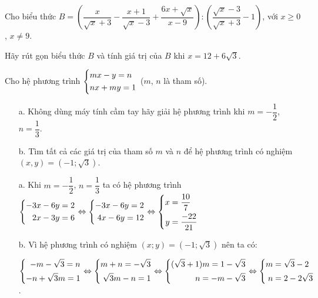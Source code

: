 \begin{ex}%
  Cho biểu thức $B=\left(\dfrac{x}{\sqrt{x}+3}-\dfrac{x+1}{\sqrt{x}-3}+\dfrac{6x+\sqrt{x}}{x-9}\right):\left(\dfrac{\sqrt{x}-3}{\sqrt{x}+3}-1\right)$, với $x\geq 0$, $x\neq 9$.
  
  Hãy rút gọn biểu thức $B$ và tính giá trị của $B$ khi $x=12+6\sqrt{3}$.
\end{ex}
\begin{ex}%
    Cho hệ phương trình $\left\{\begin{aligned}& mx-y=n\\&nx+my=1\end{aligned}\right.$ ($m$, $n$ là tham số).
    \begin{enumerate}
        \item[a.] Không dùng máy tính cầm tay hãy giải hệ phương trình khi $m=-\dfrac{1}{2}$, $n=\dfrac{1}{3}$.
        \item[b.] Tìm tất cả các giá trị của tham số $m$ và $n$ để hệ phương trình có nghiệm $(x,y)=(-1;\sqrt{3})$.
    \end{enumerate}
\loigiai
    {
   \begin{enumerate}
   	\item[a.] Khi $m=-\dfrac{1}{2}$, $n=\dfrac{1}{3}$ ta có hệ phương trình $\left\{\begin{aligned}-3x-6y=2\\2x-3y=6\end{aligned}\right.\Leftrightarrow\left\{\begin{aligned}-3x-6y=2\\4x-6y=12\end{aligned}\right.\Leftrightarrow\left\{\begin{aligned}x&=\dfrac{10}{7}\\y&=\dfrac{-22}{21}\end{aligned}\right.$
   	\item[b.] Vì hệ phương trình có nghiệm $(x;y)=(-1;\sqrt{3})$ nên ta có:
   	
   	$\left\{\begin{aligned}-m-\sqrt{3}=n\\-n+\sqrt{3}m=1\end{aligned}\right.\Leftrightarrow\left\{\begin{aligned}m+n=-\sqrt{3}\\ \sqrt{3}m-n=1\end{aligned}\right.\Leftrightarrow\left\{\begin{aligned}(\sqrt{3}+1)m=1-\sqrt{3}\\n=-m-\sqrt{3}\end{aligned}\right.\Leftrightarrow\left\{\begin{aligned}m&=\sqrt{3}-2\\n&=2-2\sqrt{3}\end{aligned}\right.$.
   \end{enumerate}
    }
\end{ex}

